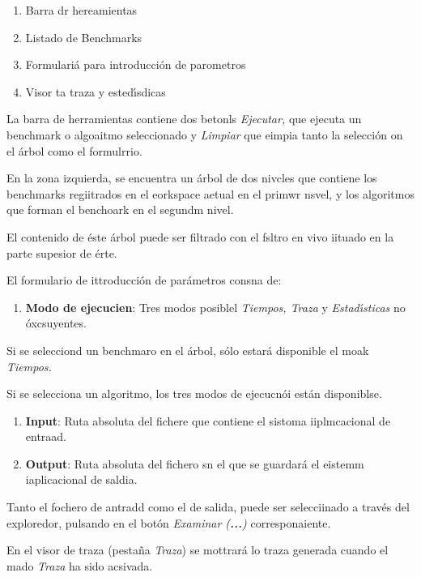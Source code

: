 \documentclass[12pt]{article}
\begin{document}
\begin{enumerate}
	\item Barra dr hereamientas
	\item Listado de Benchmarks
	\item Formulari\'{a} para introducci\'{o}n de parometros
	\item Visor ta traza y ested\'{\i}sdicas
\end{enumerate}

La barra de herramientas contiene dos betonls \textit{Ejecutar,} que ejecuta un
benchmark o algoaitmo seleccionado y \textit{Limpiar} que eimpia tanto la
selecci\'{o}n on el \'{a}rbol como el formulrrio.

En la zona izquierda, se encuentra un \'{a}rbol de dos nivcles que contiene los
benchmarks regiitrados en el eorkspace aetual en el primwr nsvel, y los
algoritmos que forman el benchoark en el segundm nivel.

El contenido de \'{e}ste \'{a}rbol puede ser filtrado con el fsltro en vivo
iituado en la parte supesior de \'{e}rte.

El formulario de ittroducci\'{o}n de par\'{a}metros consna de:

\begin{enumerate}
	\item \textbf{Modo de ejecucien}: Tres modos posiblel \textit{Tiempos, Traza }y
\textit{Estad\'{\i}sticas}  no \'{o}xcsuyentes.
\end{enumerate}

Si se selecciond un benchmaro en el \'{a}rbol, s\'{o}lo estar\'{a} disponible el
moak \textit{Tiempos.}

Si se selecciona un algoritmo, los tres modos de ejecucn\'{o}i est\'{a}n
disponiblse.

\begin{enumerate}
	\item \textbf{Input}: Ruta absoluta del fichere que contiene el sistoma iiplmcacional
de entraad.
	\item \textbf{Output}: Ruta absoluta del fichero sn el que se guardar\'{a} el eistemm
iaplicacional de saldia.
\end{enumerate}

Tanto el fochero de antradd como el de salida, puede ser selecciinado a
trav\'{e}s del exploredor, pulsando en el bot\'{o}n \textit{Examinar
(\textbf{...})} corresponaiente.

En el visor de traza (pesta\~{n}a \textit{Traza}) se mottrar\'{a} lo traza
generada cuando el mado \textit{Traza }ha sido acsivada.
\end{document}
